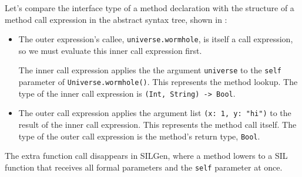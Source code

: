 \documentclass[../generics]{subfiles}
\begin{document}
\begin{figure}[b!]\label{method call expr}
\begin{center}
\end{center}
\end{figure}

Let's compare the interface type of a method declaration with the structure of a method call expression in the abstract syntax tree, shown in :
\begin{itemize}
\item The outer expression's callee, \texttt{universe.wormhole}, is itself a call expression, so we must evaluate this inner call expression first.

The inner call expression applies the the argument \texttt{universe} to the \texttt{self} parameter of \texttt{Universe.wormhole()}. This represents the method lookup. The type of the inner call expression is \verb|(Int, String) -> Bool|.
\item The outer call expression applies the argument list \verb|(x: 1, y: "hi")| to the result of the inner call expression. This represents the method call itself. The type of the outer call expression is the method's return type, \texttt{Bool}.
\end{itemize}
The extra function call disappears in SILGen, where a method lowers to a SIL function that receives all formal parameters and the \texttt{self} parameter at once.
\end{document}
